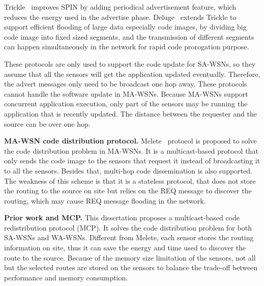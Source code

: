Trickle~\cite{trickle} improves SPIN by adding periodical advertisement feature, which reduces the energy used in the 
advertise phase. Deluge~\cite{deluge} extends Trickle to support efficient flooding of large data especially code 
images, by dividing big code image into fixed sized segments, and the transmission of different segments can happen 
simultaneously in the network for rapid code prorogation purpose. 

These protocols are only used to support the code update for SA-WSNs, so they assume that all the sensors will get the 
application updated eventually. Therefore, the advert messages only need to be broadcast one hop away.
These protocols cannot handle the software update in MA-WSNs.
Because MA-WSNs support concurrent application execution, only part of the sensors may be running the application that 
is recently updated. 
The distance between the requester and the source can be over one hop.

\textbf{MA-WSN code distribution protocol.}
 Melete~\cite{melete} protocol is proposed to solve the code distribution problem in MA-WSNs.
It is a multicast-based protocol that only sends the code image to the sensors that request it instead of broadcasting 
it to all the sensors. Besides that, multi-hop code dissemination is also supported. The weakness of this scheme is 
that it is a stateless protocol, that does not store the routing to the source on site but relies on the REQ message to 
discover the routing, which may cause REQ message flooding in the network.


\textbf{Prior work and MCP.}
This dissertation proposes a multicast-based code redistribution protocol (MCP).
It solves the code distribution problem for both SA-WSNs and WA-WSNs.
Different from Melete, each sensor stores the routing information on site, thus
it can save the energy and time used to discover the route to the source.
Because of the memory size limitation of the sensors, not all but the selected routes
are stored on the sensors to balance the trade-off between performance and memory consumption.

